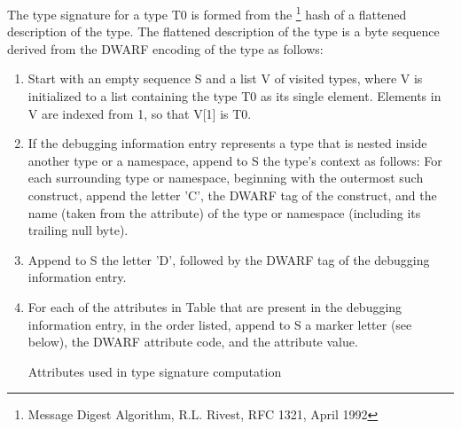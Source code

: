The type signature for a type T0 is formed from the 
\MDfive{}\footnote{ Message Digest Algorithm, 
R.L. Rivest, RFC 1321, April 1992}
hash of a flattened description of the type. The flattened
description of the type is a byte sequence derived from the
DWARF encoding of the type as follows:
\begin{enumerate}[1. ]

\item Start with an empty sequence S and a list V of visited
types, where V is initialized to a list containing the type
T0 as its single element. Elements in V are indexed from 1,
so that V[1] is T0.

\item If the debugging information entry represents a type that
is nested inside another type or a namespace, append to S
the type\textquoteright s context as follows: For each surrounding type
or namespace, beginning with the outermost such construct,
append the letter 'C', the DWARF tag of the construct, and
the name (taken from 
the \DWATname{} attribute) of the type
or namespace (including its trailing null byte).

\item  Append to S the letter 'D', followed by the DWARF tag of
the debugging information entry.

\item For each of the attributes in
Table 
that are present in
the debugging information entry, in the order listed,
append to S a marker letter (see below), the DWARF attribute
code, and the attribute value.

\begin{table}[ht]
\caption{Attributes used in type signature computation}
\label{tab:attributesusedintypesignaturecomputation}
\simplerule[\textwidth]
\begin{center}
\end{center}
\simplerule[\textwidth]
\end{table}


\end{enumerate}
